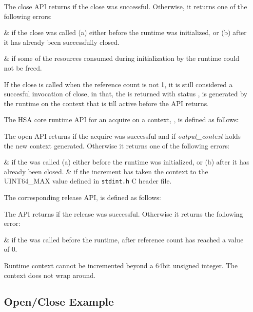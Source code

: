 

The close API returns  if the close
was successful. Otherwise, it returns one of the following errors:

\begin{easylist}
&  if the close was
called (a) either before the runtime was initialized, or (b)
after it has already been successfully closed.

&  if some of the
resources consumed during initialization by the runtime could not be
freed.
\end{easylist}

If the close is called when the reference count is not 1, it is
still considered a succesful invocation of close, in that, the
 is returned with status
, is generated by the
runtime on the context that is till active before the API returns.

The HSA core runtime API for an acquire on a context,
, is defined as follows:



The open API returns  if the acquire was
successful and if {\itshape output\_context} holds the new context
generated. Otherwise it returns one of the following errors:

\begin{easylist}
&  if the
 was called (a) either before the
runtime was initialized, or (b) after it has already been
closed.
&  if the increment has
taken the context to the UINT64\_MAX value defined in
\texttt{stdint.h} C header file.
\end{easylist}

The corresponding release API,  is
defined as follows:



The  API returns
 if the release was successful.
Otherwise it returns the following error:

\begin{easylist}
&  if the
 was called before the
runtime, after reference count has reached a value of 0.

Runtime context cannot be incremented beyond a 64bit unsigned
integer. The context does not wrap around.

\end{easylist}
\subsection{Open/Close Example}




